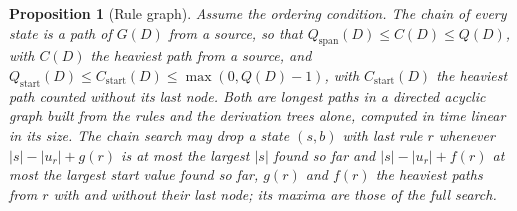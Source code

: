 \documentclass[11pt,a4paper]{article}
\theoremstyle{definition}
\theoremstyle{plain}
\newtheorem{proposition}{Proposition}
\begin{document}
\begin{proposition}[Rule graph]\label{prop:rulegraph}
Assume the ordering condition. The chain of every state is a path of \(G(D)\) from a source, so that
\(Q_{\mathrm{span}}(D) \le C(D) \le Q(D)\), with \(C(D)\) the heaviest path from a source, and
\(Q_{\mathrm{start}}(D) \le C_{\mathrm{start}}(D) \le \max(0, Q(D) - 1)\), with \(C_{\mathrm{start}}(D)\) the heaviest
path counted without its last node. Both are longest paths in a directed acyclic graph built from the rules and the
derivation trees alone, computed in time linear in its size. The chain search may drop a state \((s, b)\) with last rule
\(r\) whenever \(|s| - |u_r| + g(r)\) is at most the largest \(|s|\) found so far and \(|s| - |u_r| + f(r)\) at most the
largest start value found so far, \(g(r)\) and \(f(r)\) the heaviest paths from \(r\) with and without their last node;
its maxima are those of the full search.
\end{proposition}
\end{document}
